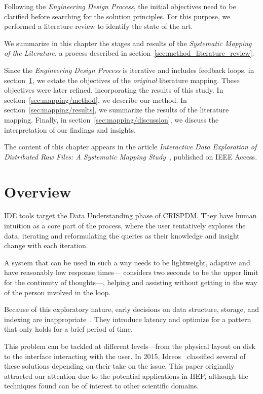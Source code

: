 
Following the \emph{Engineering Design Process}, the initial objectives
need to be clarified before searching for the solution principles.
For this purpose, we performed a literature review to identify the
state of the art.

We summarize in this chapter the stages and results of the
\emph{Systematic Mapping of the Literature}, a process described in section~\ref{sec:method_literature_review}.

Since the \emph{Engineering Design Process} is iterative and includes feedback loops, in
section~\ref{sec:mapping/overview}, we estate the objectives of the
\emph{original} literature mapping. These objectives were later refined,
incorporating the results of this study.
In section~\ref{sec:mapping/method}, we describe our method.
In section~\ref{sec:mapping/results}, we summarize the results of the literature mapping.
Finally, in section~\ref{sec:mapping/discussion}, we discuss the interpretation of our findings
and insights.

The content of this chapter appears in the article \emph{Interactive Data Exploration
of Distributed Raw Files: A Systematic Mapping Study}~\cite{Alvarez2019},
published on IEEE Access.

\section{Overview}
\label{sec:mapping/overview}
\gls{IDE} tools target the Data Understanding phase of \gls{CRISPDM}. They have
human intuition as a core part of the process, where the user tentatively
explores the data, iterating and reformulating the queries as
their knowledge and insight change with each iteration.

A system that can be used in such a way needs to be lightweight, adaptive
and have reasonably low response times---\cite{Miller1968} considers two seconds
to be the upper limit for the continuity of thoughts---,
helping and assisting without getting in the way of the person involved in
the loop.

Because of this exploratory nature, early decisions on data structure,
storage, and indexing are inappropriate~\cite{Kersten2011}. They introduce latency
and optimize for a pattern that only holds for a brief period of time.

This problem can be tackled at different levels---from the physical layout on disk
to the interface interacting with the user. In 2015, Idreos~\cite{Idreos2015}
classified several of these solutions depending on their take
on the issue. This paper originally attracted our attention  due to the potential
applications in \gls{HEP}\footnotemark, although
the techniques found can be of interest to other scientific domains.

